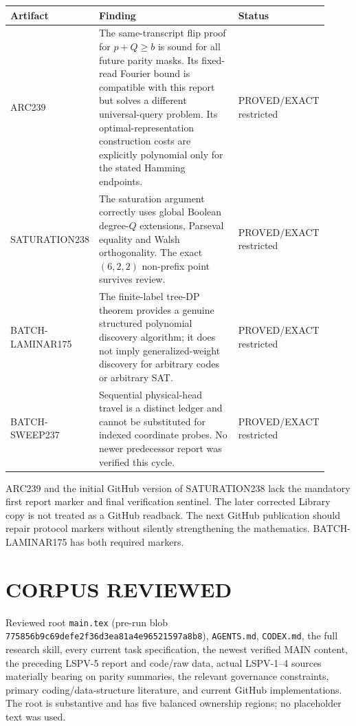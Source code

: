 \documentclass[11pt]{article}
\newcommand{\status}[1]{\textsc{#1}}
\begin{document}
\begin{longtable}{p{0.14\linewidth}p{0.61\linewidth}p{0.17\linewidth}}
\toprule
Artifact & Finding & Status\\
\midrule
ARC239 & The same-transcript flip proof for $p+Q\ge b$ is sound for all future parity masks.  Its fixed-read Fourier bound is compatible with this report but solves a different universal-query problem.  Its optimal-representation construction costs are explicitly polynomial only for the stated Hamming endpoints. & \status{PROVED/EXACT} restricted\\
SATURATION238 & The saturation argument correctly uses global Boolean degree-$Q$ extensions, Parseval equality and Walsh orthogonality.  The exact $(6,2,2)$ non-prefix point survives review. & \status{PROVED/EXACT} restricted\\
BATCH-LAMINAR175 & The finite-label tree-DP theorem provides a genuine structured polynomial discovery algorithm; it does not imply generalized-weight discovery for arbitrary codes or arbitrary SAT. & \status{PROVED/EXACT} restricted\\
BATCH-SWEEP237 & Sequential physical-head travel is a distinct ledger and cannot be substituted for indexed coordinate probes.  No newer predecessor report was verified this cycle. & \status{PROVED/EXACT} restricted\\
\bottomrule
\end{longtable}

ARC239 and the initial GitHub version of SATURATION238 lack the mandatory first report marker and final verification sentinel.  The later corrected Library copy is not treated as a GitHub readback.  The next GitHub publication should repair protocol markers without silently strengthening the mathematics.  BATCH-LAMINAR175 has both required markers.

\section{CORPUS REVIEWED}

Reviewed root \texttt{main.tex} (pre-run blob \texttt{775856b9c69defe2f36d3ea81a4e96521597a8b8}), \texttt{AGENTS.md}, \texttt{CODEX.md}, the full research skill, every current task specification, the newest verified MAIN content, the preceding LSPV-5 report and code/raw data, actual LSPV-1--4 sources materially bearing on parity summaries, the relevant governance constraints, primary coding/data-structure literature, and current GitHub implementations.  The root is substantive and has five balanced ownership regions; no placeholder text was used.
\end{document}
